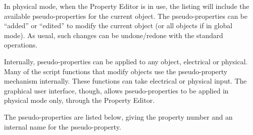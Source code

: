 In physical mode, when the {\cb Property Editor} is in use, the
listing will include the available pseudo-properties for the current
object.  The pseudo-properties can be ``added'' or ``edited'' to
modify the current object (or all objects if in global mode).  As
usual, such changes can be undone/redone with the standard operations. 

Internally, pseudo-properties can be applied to any object, electrical
or physical.  Many of the script functions that modify objects use the
pseudo-property mechanism internally.  These functions can take
electrical or physical input.  The graphical user interface, though,
allows pseudo-properties to be applied in physical mode only, through
the {\cb Property Editor}.

The pseudo-properties are listed below, giving the property number
and an internal name for the pseudo-property.

